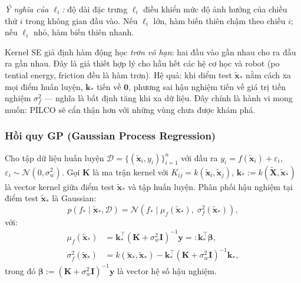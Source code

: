 \textit{Ý nghĩa của $\ell_i$:} độ dài đặc trưng $\ell_i$ điều khiển mức độ ảnh hưởng của chiều thứ $i$ trong không gian đầu vào. Nếu $\ell_i$ lớn, hàm biến thiên chậm theo chiều $i$; nếu $\ell_i$ nhỏ, hàm biến thiên nhanh.

\begin{nx}
\label{NX_se_kernel_intuition}
Kernel SE giả định hàm động học \textit{trơn vô hạn}: hai đầu vào gần nhau cho ra đầu ra gần nhau. Đây là giả thiết hợp lý cho hầu hết các hệ cơ học và robot (po tential energy, friction đều là hàm trơn). Hệ quả: khi diểm test $\tilde{\mathbf{x}}_*$ nằm cách xa mọi điểm huấn luyện, $\mathbf{k}_*$ tiến về $\mathbf{0}$, phương sai hậu nghiệm tiến về giá trị tiền nghiệm $\sigma_f^2$ --- nghĩa là bất định tăng khi xa dữ liệu. Đây chính là hành vi mong muốn: PILCO sẽ cẩn thận hơn với những vùng chưa được khám phá.
\end{nx}

\subsubsection{Hồi quy GP (Gaussian Process Regression)}
\label{SUB_SUB_SEC_gp_regression}

Cho tập dữ liệu huấn luyện $\mathcal{D} = \{(\tilde{\mathbf{x}}_i, y_i)\}_{i=1}^n$ với đầu ra $y_i = f(\tilde{\mathbf{x}}_i) + \varepsilon_i$, $\varepsilon_i \sim \mathcal{N}(0, \sigma_w^2)$. Gọi $\mathbf{K}$ là ma trận kernel với $K_{ij} = k(\tilde{\mathbf{x}}_i, \tilde{\mathbf{x}}_j)$, $\mathbf{k}_* := k(\tilde{\mathbf{X}}, \tilde{\mathbf{x}}_*)$ là vector kernel giữa điểm test $\tilde{\mathbf{x}}_*$ và tập huấn luyện. Phân phối hậu nghiệm tại điểm test $\tilde{\mathbf{x}}_*$ là Gaussian:
\begin{equation}
    p(f_* \mid \tilde{\mathbf{x}}_*, \mathcal{D}) = \mathcal{N}(f_* \mid \mu_f(\tilde{\mathbf{x}}_*),\; \sigma^2_f(\tilde{\mathbf{x}}_*)),
    \label{gp_posterior}
\end{equation}
với:
\begin{align}
    \mu_f(\tilde{\mathbf{x}}_*) &= \mathbf{k}_*^\top (\mathbf{K} + \sigma_w^2 \mathbf{I})^{-1} \mathbf{y} =: \mathbf{k}_*^\top \boldsymbol{\beta},
    \label{gp_mean} \\
    \sigma^2_f(\tilde{\mathbf{x}}_*) &= k(\tilde{\mathbf{x}}_*, \tilde{\mathbf{x}}_*) - \mathbf{k}_*^\top (\mathbf{K} + \sigma_w^2 \mathbf{I})^{-1} \mathbf{k}_*,
    \label{gp_variance}
\end{align}
trong đó $\boldsymbol{\beta} := (\mathbf{K} + \sigma_w^2 \mathbf{I})^{-1} \mathbf{y}$ là vector hệ số hậu nghiệm.


